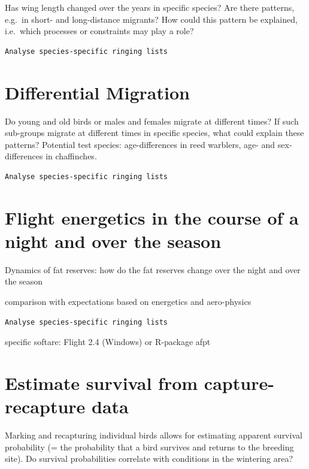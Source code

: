 \documentclass[
]{book}
\begin{document}
Has wing length changed over the years in specific species? Are there patterns, e.g.~in short- and long-distance migrants? How could this pattern be explained, i.e.~which processes or constraints may play a role?

\begin{verbatim}
Analyse species-specific ringing lists
\end{verbatim}

\hypertarget{differential-migration}{%
\section{Differential Migration}\label{differential-migration}}

Do young and old birds or males and females migrate at different times? If such sub-groups migrate at different times in specific species, what could explain these patterns? Potential test species: age-differences in reed warblers, age- and sex-differences in chaffinches.

\begin{verbatim}
Analyse species-specific ringing lists
\end{verbatim}

\hypertarget{flight-energetics-in-the-course-of-a-night-and-over-the-season}{%
\section{Flight energetics in the course of a night and over the season}\label{flight-energetics-in-the-course-of-a-night-and-over-the-season}}

Dynamics of fat reserves: how do the fat reserves change over the night and over the season

comparison with expectations based on energetics and aero-physics

\begin{verbatim}
Analyse species-specific ringing lists 
\end{verbatim}

specific softare:
Flight 2.4 (Windows)
or R-package afpt

\hypertarget{estimate-survival-from-capture-recapture-data}{%
\section{Estimate survival from capture-recapture data}\label{estimate-survival-from-capture-recapture-data}}

Marking and recapturing individual birds allows for estimating apparent survival probability (= the probability that a bird survives and returns to the breeding site). Do survival probabilities correlate with conditions in the wintering area?
\end{document}
